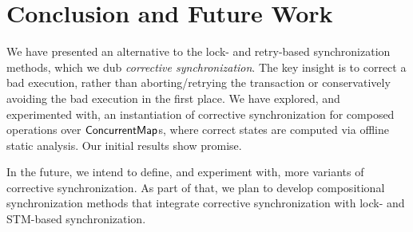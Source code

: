 \section{Conclusion and Future Work}

We have presented an alternative to the lock- and retry-based synchronization methods, which we dub \emph{corrective synchronization}. The key insight is to correct a bad execution, rather than aborting/retrying the transaction or conservatively avoiding the bad execution in the first place. We have explored, and experimented with, an instantiation of corrective synchronization for composed operations over ${\sf ConcurrentMap}$s, where correct states are computed via offline static analysis. Our initial results show promise.

In the future, we intend to define, and experiment with, more variants of corrective synchronization. As part of that, we plan to develop compositional synchronization methods that integrate corrective synchronization with lock- and STM-based synchronization.

